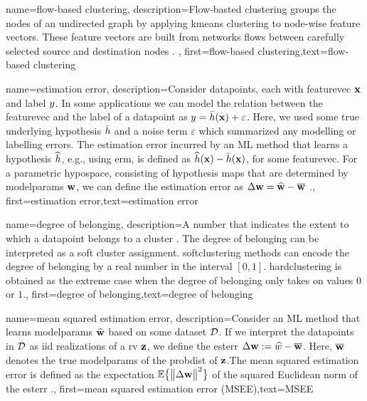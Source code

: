 {name={flow-based clustering},
	description={Flow-basted clustering groups the nodes 
		of an undirected graph by applying \gls{kmeans} clustering to node-wise feature 
		vectors. These \gls{feature} vectors are built from networks flows between 
		carefully selected source and destination nodes \cite{FlowSpecClustering2021}. }, 
	first={flow-based clustering},text={flow-based clustering} 
}



{name={estimation error},
	description={Consider \gls{datapoint}s, each with \gls{featurevec} ${\bf x}$ and \gls{label} 
		$y$. In some applications we can model the relation between the \gls{featurevec} and the \gls{label}
		of a \gls{datapoint} as $y = \bar{h}({\bf x}) + \varepsilon$. Here, we 
		used some true underlying \gls{hypothesis} $\bar{h}$ and a noise term $\varepsilon$ 
		which summarized any modelling or labelling errors. The estimation error incurred by an ML 
		method that learns a \gls{hypothesis} $\widehat{h}$, e.g., using \gls{erm}, is defined as 
		$\widehat{h}({\bf x}) - \bar{h}({\bf x})$, for some \gls{featurevec}. 
		For a parametric \gls{hypospace}, consisting of \gls{hypothesis} maps that are determined by 
		\gls{modelparams} ${\bf w}$, we can define the estimation error as $\Delta {\bf w} = \widehat{{\bf w}} - \overline{{\bf w}}$ \cite{kay,hastie01statisticallearning}.},
	first={estimation error},text={estimation error} 
}


{name={degree of belonging},
	description={A number that indicates the extent to which a \gls{datapoint} 
		belongs to a \gls{cluster} \cite[Ch. 8]{MLBasics}. The degree of belonging can be 
		interpreted as a soft \gls{cluster} assignment. \Gls{softclustering} methods can 
		encode the degree of belonging by a real number in the interval $[0,1]$. 
		\Gls{hardclustering} is obtained as the extreme case when the degree of belonging 
		only takes on values $0$ or $1$.}, first={degree of belonging},text={degree of belonging} 
}

{name={mean squared estimation error},
	description={Consider an ML method that 
		learns \gls{modelparams} $\widehat{{\bf w}}$ based on some \gls{dataset} $\mathcal{D}$. 
		If we interpret the \gls{datapoint}s in $\mathcal{D}$ as \gls{iid} \gls{realization}s of a \gls{rv} ${\bf z}$, 
		we define the \gls{esterr} $\Delta {\bf w} := \widehat{w} - \overline{{\bf w}}$. 
		Here, $\overline{{\bf w}}$ denotes the true \gls{modelparams} of the \gls{probdist} 
		of ${\bf z}$.The mean squared estimation error is 
		defined as the \gls{expectation} $\mathbb{E} \big\{ \big\| \Delta {\bf w} \big\|^{2} \big\}$ of the 
		squared Euclidean norm of the \gls{esterr} \cite{LC,kay}.},
	first={mean squared estimation error (MSEE)},text={MSEE} 
}

